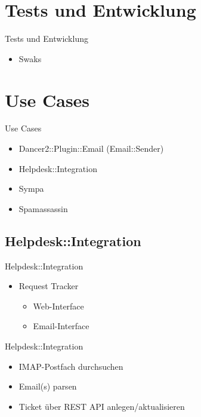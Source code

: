 \section{Tests und Entwicklung}

\begin{frame}{Tests und Entwicklung}
  \begin{itemize}
  \item Swaks
  \end{itemize}
\end{frame}

\section{Use Cases}

\begin{frame}{Use Cases}
  \begin{itemize}
  \item Dancer2::Plugin::Email (Email::Sender)
  \item Helpdesk::Integration
  \item Sympa
  \item Spamassassin
  \end{itemize}
\end{frame}

\subsection{Helpdesk::Integration}

\begin{frame}{Helpdesk::Integration}
  \begin{itemize}
  \item Request Tracker
    \begin{itemize}
    \item Web-Interface
    \item Email-Interface
    \end{itemize}
  \end{itemize}
\end{frame}

\begin{frame}{Helpdesk::Integration}
  \begin{itemize}
  \item IMAP-Postfach durchsuchen
  \item Email(s) parsen
  \item Ticket über REST API anlegen/aktualisieren
  \end{itemize}
\end{frame}

